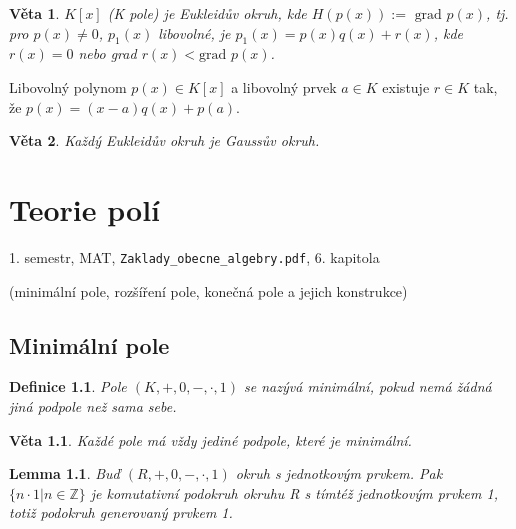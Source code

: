 \documentclass[a4paper, 11pt]{report}
\newtheorem{mydef}{Definice}[chapter]
\newtheorem{veta}{Věta}[chapter]
\newtheorem{lemma}{Lemma}[chapter]
\begin{document}
\begin{veta}
$K[x]$ (K pole) je Eukleidův okruh, kde $H(p(x)) := \text{ grad }p(x)$, tj. pro $p(x) \not= 0$, $p_1(x)$ libovolné, je $p_1(x) = p(x)q(x) + r(x)$, kde $r(x) = 0$ nebo grad $r(x) < \text{grad }p(x)$.
\end{veta}

Libovolný polynom $p(x) \in K[x]$ a libovolný prvek $a \in K$ existuje $r \in K$ tak, že $p(x) = (x - a)q(x) + p(a)$.

\begin{veta}
Každý Eukleidův okruh je Gaussův okruh.
\end{veta}













\chapter{Teorie polí} \label{cha:11}

1. semestr, MAT, \texttt{Zaklady\_obecne\_algebry.pdf}, 6. kapitola

(minimální pole, rozšíření pole, konečná pole a jejich konstrukce)

\section{Minimální pole}
\begin{mydef}
Pole $(K, +, 0, -, \cdot, 1)$ se nazývá minimální, pokud nemá žádná jiná podpole než sama sebe.
\end{mydef}

\begin{veta}
Každé pole má vždy jediné podpole, které je minimální.
\end{veta}

\begin{lemma}
Buď $(R, +, 0, -, \cdot, 1)$ okruh s jednotkovým prvkem. Pak $\{n \cdot 1 | n \in \mathbb{Z}\}$ je komutativní podokruh okruhu R s tímtéž jednotkovým prvkem 1, totiž podokruh generovaný prvkem 1.
\end{lemma}
\end{document}
